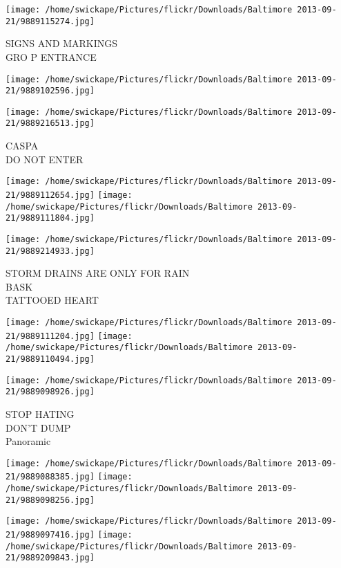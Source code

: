 \documentclass[10pt,letterpaper]{article}
\begin{document}
\vspace{0.25in}
\texttt{[image: /home/swickape/Pictures/flickr/Downloads/Baltimore 2013-09-21/9889115274.jpg]}

SIGNS AND MARKINGS\\
GRO P ENTRANCE\\
\pagebreak

\texttt{[image: /home/swickape/Pictures/flickr/Downloads/Baltimore 2013-09-21/9889102596.jpg]}

\vspace{0.25in}
\texttt{[image: /home/swickape/Pictures/flickr/Downloads/Baltimore 2013-09-21/9889216513.jpg]}

CASPA\\
DO NOT ENTER\\
\pagebreak

\texttt{[image: /home/swickape/Pictures/flickr/Downloads/Baltimore 2013-09-21/9889112654.jpg]}
\texttt{[image: /home/swickape/Pictures/flickr/Downloads/Baltimore 2013-09-21/9889111804.jpg]}

\vspace{0.25in}
\texttt{[image: /home/swickape/Pictures/flickr/Downloads/Baltimore 2013-09-21/9889214933.jpg]}

STORM DRAINS ARE ONLY FOR RAIN\\
BASK\\
TATTOOED HEART\\
\pagebreak

\texttt{[image: /home/swickape/Pictures/flickr/Downloads/Baltimore 2013-09-21/9889111204.jpg]}
\texttt{[image: /home/swickape/Pictures/flickr/Downloads/Baltimore 2013-09-21/9889110494.jpg]}

\vspace{0.25in}
\texttt{[image: /home/swickape/Pictures/flickr/Downloads/Baltimore 2013-09-21/9889098926.jpg]}

STOP HATING\\
DON'T DUMP\\
Panoramic\\
\pagebreak

\texttt{[image: /home/swickape/Pictures/flickr/Downloads/Baltimore 2013-09-21/9889088385.jpg]}
\texttt{[image: /home/swickape/Pictures/flickr/Downloads/Baltimore 2013-09-21/9889098256.jpg]}

\texttt{[image: /home/swickape/Pictures/flickr/Downloads/Baltimore 2013-09-21/9889097416.jpg]}
\texttt{[image: /home/swickape/Pictures/flickr/Downloads/Baltimore 2013-09-21/9889209843.jpg]}
\end{document}
